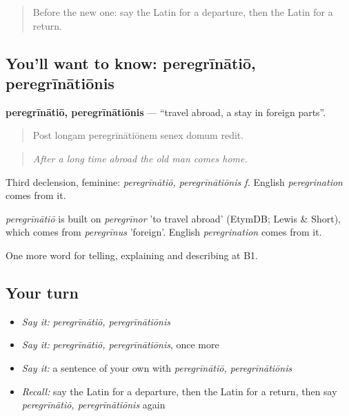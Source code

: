 \begin{quote}
Before the new one: say the Latin for a departure, then the Latin for a return.
\end{quote}

\subsection*{You'll want to know: peregrīnātiō, peregrīnātiōnis}
\textbf{peregrīnātiō, peregrīnātiōnis} — \textquotedblleft{}travel abroad, a stay in foreign parts\textquotedblright{}.

\begin{quote}
Post longam peregrīnātiōnem senex domum redit.
\end{quote}

\begin{quote}
\emph{After a long time abroad the old man comes home.}
\end{quote}

Third declension, feminine: \emph{peregrīnātiō, peregrīnātiōnis f.} English \emph{peregrination} comes from it.

\begin{cousinweb}
\emph{peregrīnātiō} is built on \emph{peregrīnor} 'to travel abroad' (EtymDB; Lewis \& Short), which comes from \emph{peregrīnus} 'foreign'. English \emph{peregrination} comes from it.
\end{cousinweb}

\begin{grammarlens}[title={What you've built}]
One more word for telling, explaining and describing at B1.
\end{grammarlens}

\subsection*{Your turn}
\begin{itemize}
\raggedright
  \item \emph{Say it:} \emph{peregrīnātiō, peregrīnātiōnis}
  \item \emph{Say it:} \emph{peregrīnātiō, peregrīnātiōnis}, once more
  \item \emph{Say it:} a sentence of your own with \emph{peregrīnātiō, peregrīnātiōnis}
  \item \emph{Recall:} say the Latin for a departure, then the Latin for a return, then say \emph{peregrīnātiō, peregrīnātiōnis} again
\end{itemize}

